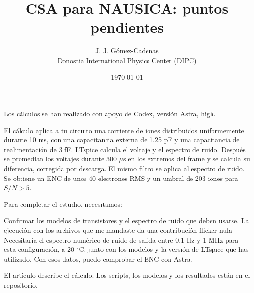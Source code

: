 \documentclass[11pt,a4paper]{article}
\title{CSA para NAUSICA: puntos pendientes}
\author{J. J. G\'omez-Cadenas\\
 {\small Donostia International Physics Center (DIPC)}}
\date{\today}
\begin{document}
\maketitle
Los cálculos se han realizado con apoyo de Codex, versión Astra, high.

El cálculo aplica a tu circuito una corriente de iones distribuidos uniformemente durante 10 ms, con una capacitancia externa de 1.25 pF y una capacitancia de realimentación de 3 fF. LTspice calcula el voltaje y el espectro de ruido. Después se promedian los voltajes durante 300 $\mu$s en los extremos del frame y se calcula su diferencia, corregida por descarga. El mismo filtro se aplica al espectro de ruido. Se obtiene un ENC de unos 40 electrones RMS y un umbral de 203 iones para $S/N>5$.

Para completar el estudio, necesitamos:

Confirmar los modelos de transistores y el espectro de ruido que deben usarse. La ejecución con los archivos que me mandaste da una contribución flicker nula. Necesitaría el espectro numérico de ruido de salida entre 0.1 Hz y 1 MHz para esta configuración, a 20 $^\circ$C, junto con los modelos y la versión de LTspice que has utilizado. Con esos datos, puedo comprobar el ENC con Astra.

El artículo describe el cálculo. Los scripts, los modelos y los resultados están en el repositorio.
\end{document}
